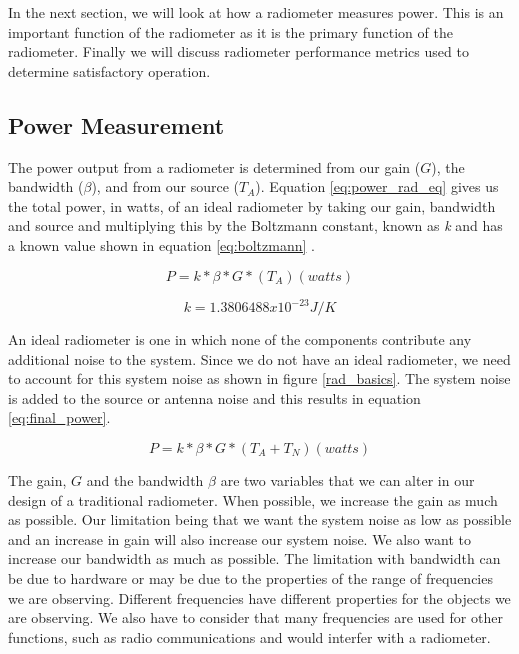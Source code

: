 In the next section, we will look at how a radiometer measures power.  This is an important function of the radiometer as it is the primary function of the radiometer.  Finally we will discuss radiometer performance metrics used to determine satisfactory operation.

\subsection{Power Measurement}


The power output from a radiometer is determined from our gain ($G$), the bandwidth ($\beta$), and from our source ($T_{A}$).  Equation \ref{eq:power_rad_eq} gives us the total power, in watts, of an ideal radiometer by taking our gain, bandwidth and source and multiplying this by the Boltzmann constant, known as \textit{k} and has a known value shown in equation \ref{eq:boltzmann} .

\begin{equation} \label{eq:power_rad_eq}
P=k*\beta*G*(T_{A}) (watts)
\end{equation}

\begin{equation} \label{eq:boltzmann}
k = 1.3806488 x 10^{-23} J/K
\end{equation}

An ideal radiometer is one in which none of the components contribute any additional noise to the system.  Since we do not have an ideal radiometer, we need to account for this system noise as shown in figure \ref{rad_basics}.  The system noise is added to the source or antenna noise and this results in equation \ref{eq:final_power}.

\begin{equation} \label{eq:final_power}
P=k*\beta*G*(T_{A}+T_{N}) (watts)
\end{equation}

The gain, $G$ and the bandwidth $\beta$ are two variables that we can alter in our design of a traditional radiometer.  When possible, we increase the gain as much as possible.  Our limitation being that we want the system noise as low as possible and an increase in gain will also increase our system noise.  We also want to increase our bandwidth as much as possible.  The limitation with bandwidth can be due to hardware or may be due to the properties of the range of frequencies we are observing.  Different frequencies have different properties for the objects we are observing.  We also have to consider that many frequencies are used for other functions, such as radio communications and would interfer with a radiometer.  

